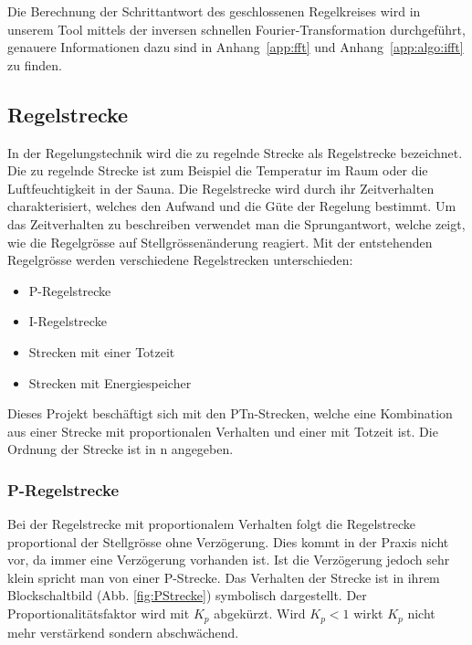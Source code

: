 Die  Berechnung   der  Schrittantwort  des  geschlossenen   Regelkreises  wird
in  unserem   Tool  mittels  der  inversen   schnellen  Fourier-Transformation
durchgef\"uhrt, genauere  Informationen dazu sind in  Anhang~\ref{app:fft} und
Anhang~\ref{app:algo:ifft} zu finden.


\subsection{Regelstrecke}

In  der  Regelungstechnik  wird  die  zu  regelnde  Strecke  als  Regelstrecke
bezeichnet. Die  zu   regelnde  Strecke   ist  zum  Beispiel   die  Temperatur
im  Raum  oder  die  Luftfeuchtigkeit  in  der  Sauna. Die  Regelstrecke  wird
durch  ihr   Zeitverhalten  charakterisiert,  welches  den   Aufwand  und  die
G\"ute   der   Regelung   bestimmt. Um  das   Zeitverhalten   zu   beschreiben
verwendet  man die  Sprungantwort,  welche zeigt,  wie  die Regelgr\"osse  auf
Stellgr\"ossen\"anderung reagiert. Mit  der entstehenden  Regelgr\"osse werden
verschiedene Regelstrecken unterschieden:

\begin{itemize}
    \item
        P-Regelstrecke
    \item
        I-Regelstrecke
    \item
        Strecken mit einer Totzeit
    \item
        Strecken mit Energiespeicher
\end{itemize}

Dieses  Projekt   besch\"aftigt  sich   mit  den  PTn-Strecken,   welche  eine
Kombination  aus einer  Strecke  mit proportionalen  Verhalten  und einer  mit
Totzeit ist. Die Ordnung der Strecke ist in n angegeben.

\subsubsection*{P-Regelstrecke}
Bei  der  Regelstrecke mit  proportionalem  Verhalten  folgt die  Regelstrecke
proportional der  Stellgr\"osse ohne  Verz\"ogerung. Dies kommt in  der Praxis
nicht vor,  da immer eine  Verz\"ogerung vorhanden ist. Ist  die Verz\"ogerung
jedoch  sehr  klein  spricht  man   von  einer  P-Strecke. Das  Verhalten  der
Strecke  ist in  ihrem Blockschaltbild  (Abb. \ref  {fig:PStrecke}) symbolisch
dargestellt. Der  Proportionalit\"atsfaktor wird  mit $K_p$  abgek\"urzt. Wird
$K_p<1$ wirkt $K_p$ nicht mehr verst\"arkend sondern abschw\"achend.

